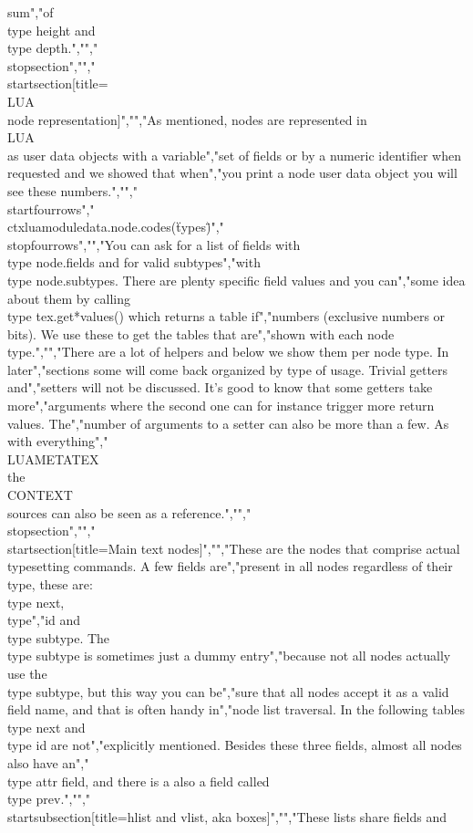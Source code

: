 sum","of \\type {height} and \\type {depth}.","","\\stopsection","","\\startsection[title={\\LUA\\ node representation}]","","As mentioned, nodes are represented in \\LUA\\ as user data objects with a variable","set of fields or by a numeric identifier when requested and we showed that when","you print a node user data object you will see these numbers.","","\\startfourrows","\\ctxlua{moduledata.node.codes(\"types\")}","\\stopfourrows","","You can ask for a list of fields with \\type {node.fields} and for valid subtypes","with \\type {node.subtypes}. There are plenty specific field values and you can","some idea about them by calling \\type {tex.get*values()} which returns a table if","numbers (exclusive numbers or bits). We use these to get the tables that are","shown with each node type.","","There are a lot of helpers and below we show them per node type. In later","sections some will come back organized by type of usage. Trivial getters and","setters will not be discussed. It's good to know that some getters take more","arguments where the second one can for instance trigger more return values. The","number of arguments to a setter can also be more than a few. As with everything","\\LUAMETATEX\\ the \\CONTEXT\\ sources can also be seen as  a reference.","","\\stopsection","","\\startsection[title={Main text nodes}]","","These are the nodes that comprise actual typesetting commands. A few fields are","present in all nodes regardless of their type, these are: \\type {next}, \\type","{id} and \\type {subtype}. The \\type {subtype} is sometimes just a dummy entry","because not all nodes actually use the \\type {subtype}, but this way you can be","sure that all nodes accept it as a valid field name, and that is often handy in","node list traversal. In the following tables \\type {next} and \\type {id} are not","explicitly mentioned. Besides these three fields, almost all nodes also have an","\\type {attr} field, and there is a also a field called \\type {prev}.","","\\startsubsection[title={hlist and vlist, aka boxes}]","","These lists share fields and 